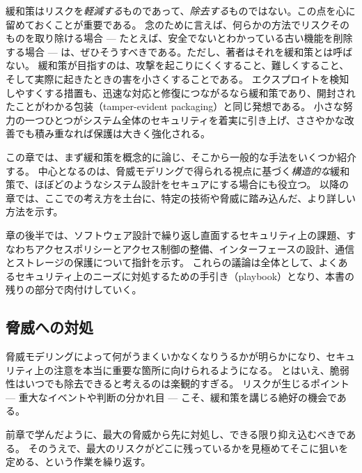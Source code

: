 \documentclass[uplatex]{jsarticle}
\def\label#1{}%
\begin{document}
\begin{rem}[緩和策はリスクを減らすが除去はしない]\label{rem:ch3-mitigation-not-elimination}
緩和策はリスクを\emph{軽減する}ものであって、\emph{除去する}ものではない。この点を心に留めておくことが重要である。
念のために言えば、何らかの方法でリスクそのものを取り除ける場合 --- たとえば、安全でないとわかっている古い機能を削除する場合 --- は、ぜひそうすべきである。ただし、著者はそれを緩和策とは呼ばない。
緩和策が目指すのは、攻撃を起こりにくくすること、難しくすること、そして実際に起きたときの害を小さくすることである。
エクスプロイトを検知しやすくする措置も、迅速な対応と修復につながるなら緩和策であり、開封されたことがわかる包装（tamper-evident packaging）と同じ発想である。
小さな努力の一つひとつがシステム全体のセキュリティを着実に引き上げ、ささやかな改善でも積み重なれば保護は大きく強化される。
\end{rem}

この章では、まず緩和策を概念的に論じ、そこから一般的な手法をいくつか紹介する。
中心となるのは、脅威モデリングで得られる視点に基づく\emph{構造的な}緩和策で、ほぼどのようなシステム設計をセキュアにする場合にも役立つ。
以降の章では、ここでの考え方を土台に、特定の技術や脅威に踏み込んだ、より詳しい方法を示す。

章の後半では、ソフトウェア設計で繰り返し直面するセキュリティ上の課題、すなわちアクセスポリシーとアクセス制御の整備、インターフェースの設計、通信とストレージの保護について指針を示す。
これらの議論は全体として、よくあるセキュリティ上のニーズに対処するための手引き（playbook）となり、本書の残りの部分で肉付けしていく。

\subsection{脅威への対処}\label{subsec:ch3-addressing-threats}

脅威モデリングによって何がうまくいかなくなりうるかが明らかになり、セキュリティ上の注意を本当に重要な箇所に向けられるようになる。
とはいえ、脆弱性はいつでも除去できると考えるのは楽観的すぎる。
リスクが生じるポイント --- 重大なイベントや判断の分かれ目 --- こそ、緩和策を講じる絶好の機会である。

前章で学んだように、最大の脅威から先に対処し、できる限り抑え込むべきである。
そのうえで、最大のリスクがどこに残っているかを見極めてそこに狙いを定める、という作業を繰り返す。
\end{document}
